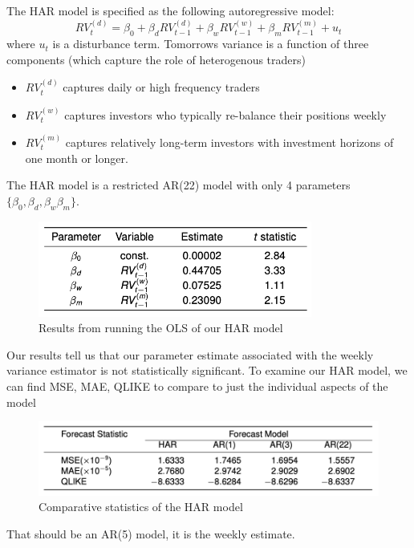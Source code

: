 \documentclass[11pt]{article}
\begin{document}
\begin{definition}
    The HAR model is specified as the following autoregressive model:
    \begin{equation}
    \label{HAR}
R V_t^{(d)}=\beta_0+\beta_d R V_{t-1}^{(d)}+\beta_w R V_{t-1}^{(w)}+\beta_m R V_{t-1}^{(m)}+u_t
\end{equation}
where $u_t$ is a disturbance term. Tomorrows variance is a function of three components (which capture the role of heterogenous traders)
\begin{itemize}
    \item $RV_t^{(d)}$ captures daily or high frequency traders
    \item $RV_t^{(w)}$ captures investors who typically re-balance their positions weekly
    \item $RV_t^{(m)}$ captures relatively long-term investors with investment horizons of one month or longer.
\end{itemize}
The HAR model is a restricted AR(22) model with only 4 parameters $\{\beta_0, \beta_d, \beta_w \beta_m\}$. 
\end{definition}

\begin{figure}[h]
    \centering
    \includegraphics[width=9cm]{pics/HAR results.png}
    \caption{Results from running the OLS of our HAR model}
    \label{fig:mHAR results}
\end{figure}

Our results tell us that our parameter estimate associated with the weekly variance estimator is not statistically significant. To examine our HAR model, we can find MSE, MAE, QLIKE to compare to just the individual aspects of the model

\begin{figure}[h]
    \centering
    \includegraphics[width=12cm]{pics/HAR measurement stats.png}
    \caption{Comparative statistics of the HAR model}
    \label{fig:HAR compare}
\end{figure}
\begin{note}
    That should be an AR(5) model, it is the weekly estimate.
\end{note}
\end{document}
